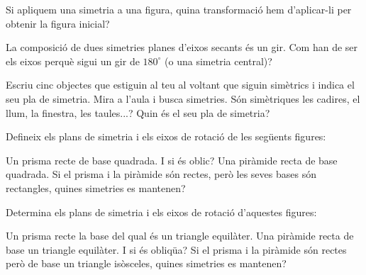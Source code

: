 \begin{mylist}
\exer  Si apliquem una simetria a una figura, quina transformació hem d'aplicar-li per obtenir la figura inicial?

 
\exer  La composició de dues simetries planes d'eixos secants és un gir. Com han de ser els eixos perquè sigui un gir de $180^\circ$ (o una simetria central)?


\exer   Escriu cinc objectes que estiguin al teu al voltant que siguin simètrics i indica el seu pla de simetria. Mira a l'aula i busca simetries. Són simètriques les cadires, el llum, la finestra, les taules...? Quin és el seu pla de simetria?

 
\exer  Defineix els plans de simetria i els eixos de rotació de les següents figures:
\begin{tasks}
	\task  Un prisma recte de base quadrada. I si és oblic?
	\task  Una piràmide recta de base quadrada.
	\task  Si el prisma i la piràmide són rectes, però les seves bases són rectangles, quines simetries es mantenen?
\end{tasks}



\exer   Determina els plans de simetria i els eixos de rotació d'aquestes figures:
\begin{tasks}
	\task  Un prisma recte la base del qual és un triangle equilàter.
	\task  Una piràmide recta de base un triangle equilàter. I si és obliqüa?
	\task  Si el prisma i la piràmide són rectes però de base un triangle isòsceles, quines simetries es mantenen?
\end{tasks}


\end{mylist}
